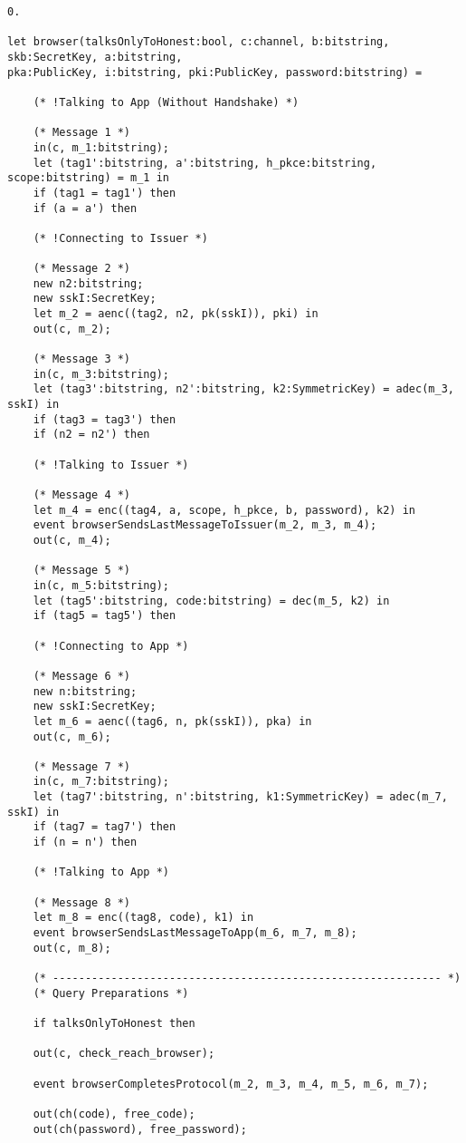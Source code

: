 \begin{Verbatim}[fontsize=\small]
    0.

let browser(talksOnlyToHonest:bool, c:channel, b:bitstring, skb:SecretKey, a:bitstring,
pka:PublicKey, i:bitstring, pki:PublicKey, password:bitstring) =

    (* !Talking to App (Without Handshake) *)

    (* Message 1 *)
    in(c, m_1:bitstring);
    let (tag1':bitstring, a':bitstring, h_pkce:bitstring, scope:bitstring) = m_1 in
    if (tag1 = tag1') then
    if (a = a') then

    (* !Connecting to Issuer *)

    (* Message 2 *)
    new n2:bitstring;
    new sskI:SecretKey;
    let m_2 = aenc((tag2, n2, pk(sskI)), pki) in
    out(c, m_2);

    (* Message 3 *)
    in(c, m_3:bitstring);
    let (tag3':bitstring, n2':bitstring, k2:SymmetricKey) = adec(m_3, sskI) in
    if (tag3 = tag3') then
    if (n2 = n2') then

    (* !Talking to Issuer *)

    (* Message 4 *)
    let m_4 = enc((tag4, a, scope, h_pkce, b, password), k2) in
    event browserSendsLastMessageToIssuer(m_2, m_3, m_4);
    out(c, m_4);

    (* Message 5 *)
    in(c, m_5:bitstring);
    let (tag5':bitstring, code:bitstring) = dec(m_5, k2) in
    if (tag5 = tag5') then

    (* !Connecting to App *)

    (* Message 6 *)
    new n:bitstring;
    new sskI:SecretKey;
    let m_6 = aenc((tag6, n, pk(sskI)), pka) in
    out(c, m_6);

    (* Message 7 *)
    in(c, m_7:bitstring);
    let (tag7':bitstring, n':bitstring, k1:SymmetricKey) = adec(m_7, sskI) in
    if (tag7 = tag7') then
    if (n = n') then

    (* !Talking to App *)

    (* Message 8 *)
    let m_8 = enc((tag8, code), k1) in
    event browserSendsLastMessageToApp(m_6, m_7, m_8);
    out(c, m_8);

    (* ------------------------------------------------------------ *)
    (* Query Preparations *)

    if talksOnlyToHonest then

    out(c, check_reach_browser);

    event browserCompletesProtocol(m_2, m_3, m_4, m_5, m_6, m_7);

    out(ch(code), free_code);
    out(ch(password), free_password);


\end{Verbatim}
